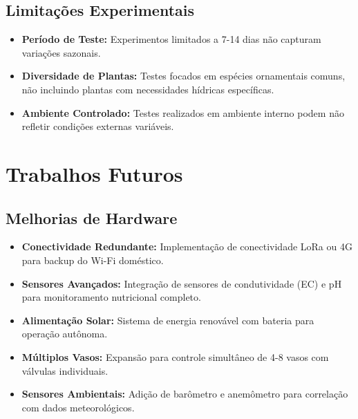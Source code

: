 \subsection{Limitações Experimentais}
\begin{itemize}
    \item \textbf{Período de Teste:} Experimentos limitados a 7-14 dias não capturam variações sazonais.
    \item \textbf{Diversidade de Plantas:} Testes focados em espécies ornamentais comuns, não incluindo plantas com necessidades hídricas específicas.
    \item \textbf{Ambiente Controlado:} Testes realizados em ambiente interno podem não refletir condições externas variáveis.
\end{itemize}

\section{Trabalhos Futuros}

\subsection{Melhorias de Hardware}
\begin{itemize}
    \item \textbf{Conectividade Redundante:} Implementação de conectividade LoRa ou 4G para backup do Wi-Fi doméstico.
    \item \textbf{Sensores Avançados:} Integração de sensores de condutividade (EC) e pH para monitoramento nutricional completo.
    \item \textbf{Alimentação Solar:} Sistema de energia renovável com bateria para operação autônoma.
    \item \textbf{Múltiplos Vasos:} Expansão para controle simultâneo de 4-8 vasos com válvulas individuais.
    \item \textbf{Sensores Ambientais:} Adição de barômetro e anemômetro para correlação com dados meteorológicos.
\end{itemize}

